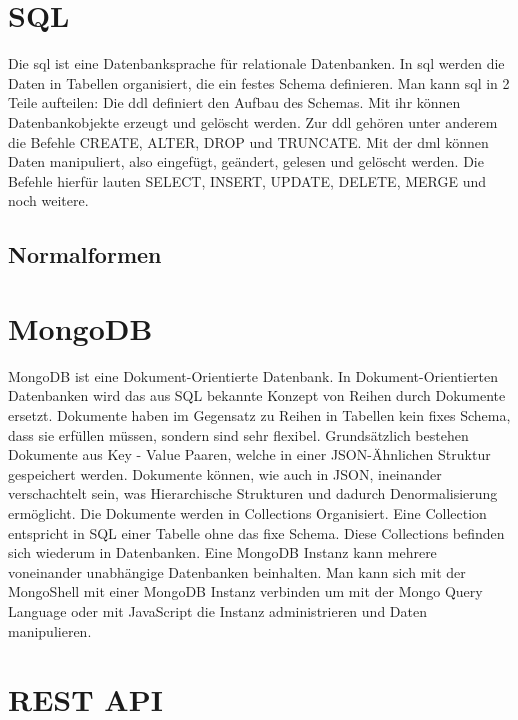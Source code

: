 \section{SQL}
\label{sec:sql}

Die \ac{sql} ist eine Datenbanksprache für relationale Datenbanken.
In \ac{sql} werden die Daten in Tabellen organisiert, die ein festes Schema definieren.
Man kann \ac{sql} in 2 Teile aufteilen:
Die \ac{ddl} definiert den Aufbau des Schemas.
Mit ihr können Datenbankobjekte erzeugt und gelöscht werden.
Zur \ac{ddl} gehören unter anderem die Befehle CREATE, ALTER, DROP und TRUNCATE\@.
Mit der \ac{dml} können Daten manipuliert, also eingefügt, geändert, gelesen und gelöscht werden.
Die Befehle hierfür lauten SELECT, INSERT, UPDATE, DELETE, MERGE und noch weitere.
~\autocite{schicker:datenbanken}

\subsection{Normalformen}
\label{sub:normalformen}

\section{MongoDB}
\label{sec:mongodb}

MongoDB ist eine Dokument-Orientierte Datenbank. 
In Dokument-Orientierten Datenbanken wird das aus SQL bekannte Konzept von Reihen durch Dokumente ersetzt.
Dokumente haben im Gegensatz zu Reihen in Tabellen kein fixes Schema, dass sie erfüllen müssen, sondern sind sehr flexibel.
Grundsätzlich bestehen Dokumente aus Key - Value Paaren, welche in einer JSON-Ähnlichen Struktur gespeichert werden.
Dokumente können, wie auch in JSON, ineinander verschachtelt sein, was Hierarchische Strukturen und dadurch Denormalisierung ermöglicht.
Die Dokumente werden in Collections Organisiert.
Eine Collection entspricht in SQL einer Tabelle ohne das fixe Schema.
Diese Collections befinden sich wiederum in Datenbanken.
Eine MongoDB Instanz kann mehrere voneinander unabhängige Datenbanken beinhalten.
Man kann sich mit der MongoShell mit einer MongoDB Instanz verbinden um mit der Mongo Query Language oder mit JavaScript die Instanz administrieren und Daten manipulieren.
~\autocite{bradshaw:mongodb}

\section{REST API}
\label{sec:rest}

